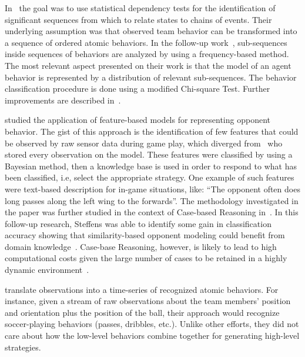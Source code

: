 In~\cite{iglesias_comparing_2006} the goal was to use statistical dependency tests for the identification of significant sequences from which to relate states to chains of events. Their underlying assumption was that observed team behavior can be transformed into a sequence of ordered atomic behaviors. In the follow-up work~\cite{burgard_classifying_2008}, sub-sequences inside sequences of behaviors are analyzed by using a frequency-based method. The most relevant aspect presented on their work is that the model of an agent behavior is represented by a distribution of relevant sub-sequences. The behavior classification procedure is done using a modified Chi-square Test. Further improvements are described in~\cite{iglesias_winning_2009}. %

\cite{steffens_feature-based_2003} studied the application of feature-based models for representing opponent behavior. The gist of this approach is the identification of few features that could be observed by raw sensor data during game play, which diverged from~\cite{fix_behavior_2000} who stored every observation on the model. These features were classified by using a Bayesian method, then a knowledge base is used in order to respond to what has been classified, i.e, select the appropriate strategy. One example of such features were text-based description for in-game situations, like: ``The opponent often does long passes along the left wing to the forwards''. The methodology investigated in the paper was further studied in the context of Case-based Reasoning in~\cite{steffens_similarity-based_2005}. In this follow-up research, Steffens was able to identify some gain in classification accuracy showing that similarity-based opponent modeling could benefit from domain knowledge~\citep{rofer_overview_2012}. Case-base Reasoning, however, is likely to lead to high computational costs given the large number of cases to be retained in a highly dynamic environment~\citep{ahmadi_using_2004,rofer_overview_2012}.

\cite{kaminka_learning_2003} translate observations into a time-series of recognized atomic behaviors. For instance, given a stream of raw observations about the team members' position and orientation plus the position of the ball, their approach would recognize soccer-playing behaviors (passes, dribbles, etc.). Unlike other efforts, they did not care about how the low-level behaviors combine together for generating high-level strategies.  

